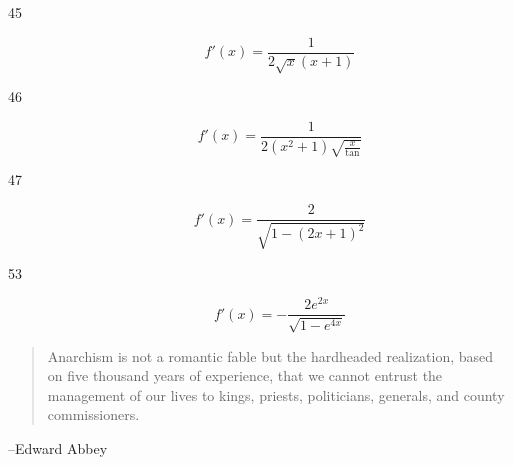 \documentclass[letterpaper]{exam}
\begin{document}
\begin{description}
    \item[45] 
      \[
        f'(x) = \frac{1}{2 \sqrt{x} (x + 1)}
      \]

    \item[46] 
      \[
        f'(x) = \frac{1}{2 \left(x^2 + 1\right) \sqrt{\frac{x}{\tan }}}
      \]

    \item[47] 
      \[
        f'(x) = \frac{2}{\sqrt{1-(2 x+1)^2}}
      \]

    \item[53] 
      \[
        f'(x) = - \frac{2 e^{2x}}{\sqrt{1 - e^{4x}}}
      \]

  \end{description}

  \else
    \vspace{10 cm}
    \begin{quote}
      \begin{em}
        Anarchism is not a romantic fable but the hardheaded realization, based
        on five thousand years of experience, that we cannot entrust the
        management of our lives to kings, priests, politicians, generals, and
        county commissioners.
      \end{em}
    \end{quote}
    \hspace{2 cm} --Edward Abbey
  \fi
\end{document}
